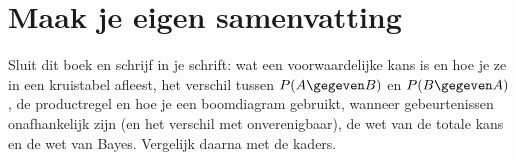 
\ifzelfstudie
\section*{Maak je eigen samenvatting}
Sluit dit boek en schrijf in je schrift: wat een voorwaardelijke kans is en hoe je ze in een kruistabel afleest, het verschil tussen $P(A \gegeven B)$ en $P(B \gegeven A)$, de productregel en hoe je een boomdiagram gebruikt, wanneer gebeurtenissen onafhankelijk zijn (en het verschil met onverenigbaar), de wet van de totale kans en de wet van Bayes. Vergelijk daarna met de kaders.
\fi
